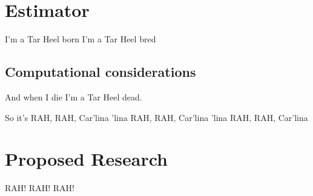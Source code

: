 

\section{Estimator} \label{sec:Intro}

I'm a Tar Heel born I'm a Tar Heel bred
\subsection{Computational considerations}

And when I die I'm a Tar Heel dead.
\newpage

So it's RAH, RAH, Car'lina 'lina
RAH, RAH, Car'lina 'lina
RAH, RAH, Car'lina

\section{Proposed Research}

RAH! RAH! RAH!